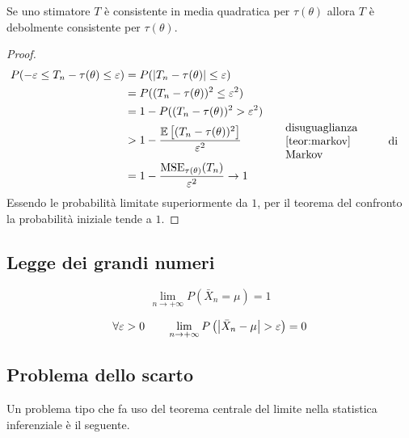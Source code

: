 \begin{teor}
	Se uno stimatore $T$ è consistente in media quadratica per $\tau(\theta)$ allora $T$ è debolmente consistente per $\tau(\theta)$.
\end{teor}
\begin{proof}
	\begin{align*}
		P(-\varepsilon\leq T_n-\tau(\theta)\leq \varepsilon) & = P(\abs{T_n-\tau(\theta)}\leq\varepsilon)                                                                         \\
		                                                     & = P((T_n-\tau(\theta))^2\leq\varepsilon^2)                                                                         \\
		                                                     & = 1 - P((T_n-\tau(\theta))^2>\varepsilon^2)                                                                        \\
		                                                     & > 1-\frac{\ev{(T_n-\tau(\theta))^2}}{\varepsilon^2} \bc{\parbox{35mm}{disuguaglianza \ref{teor:markov} di Markov}} \\
		                                                     & = 1-\frac{\MSE_{\tau(\theta)}(T_n)}{\varepsilon^2} \to 1
	\end{align*}
	Essendo le probabilità limitate superiormente da $1$, per il teorema del confronto la probabilità iniziale tende a $1$.
\end{proof}


\subsection{Legge dei grandi numeri}
\begin{teor}
	\begin{equation*}
		\lim_{n\to+\infty} P\left(\bar X_n = \mu\right) = 1
	\end{equation*}
\end{teor}

\begin{teor}
	\begin{equation*}
		\forall\varepsilon > 0 \qquad \lim_{n\to+\infty} P\left(\left\lvert \bar X_n - \mu \right\rvert > \varepsilon\right) = 0
	\end{equation*}
\end{teor}


\subsection{Problema dello scarto}
Un problema tipo che fa uso del teorema centrale del limite nella statistica inferenziale è il seguente.

